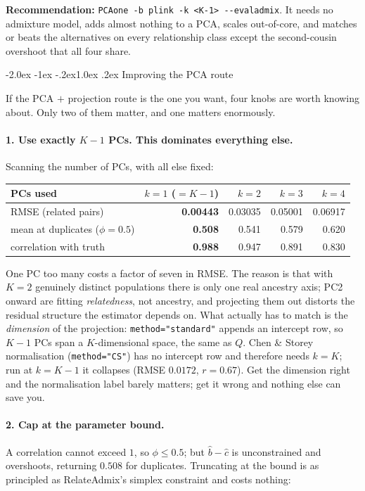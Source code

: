\documentclass[10pt,a4paper]{article}
\makeatletter
\renewcommand\subsection{\@startsection{subsection}{2}{\z@}%
  {-2.0ex \@plus -1ex \@minus -.2ex}{1.0ex \@plus.2ex}%
  {\normalfont\normalsize\bfseries\color{hdr}}}
\makeatother
\begin{document}
\textbf{Recommendation:} \texttt{PCAone -b plink -k <K-1> -{}-evaladmix}. It needs no admixture model, adds
almost nothing to a PCA, scales out-of-core, and matches or beats the alternatives on every relationship
class except the second-cousin overshoot that all four share.

\subsection{Improving the PCA route}

If the PCA $+$ projection route is the one you want, four knobs are worth knowing about. Only two of them
matter, and one matters enormously.

\paragraph{1. Use exactly $K-1$ PCs. This dominates everything else.}
Scanning the number of PCs, with all else fixed:

\begin{center}
\small
\begin{tabular}{@{}lrrrr@{}}
\toprule
PCs used & $k=1$ ($=K{-}1$) & $k=2$ & $k=3$ & $k=4$ \\
\midrule
RMSE (related pairs) & \textbf{0.00443} & 0.03035 & 0.05001 & 0.06917 \\
mean at duplicates ($\phi=0.5$) & \textbf{0.508} & 0.541 & 0.579 & 0.620 \\
correlation with truth & \textbf{0.988} & 0.947 & 0.891 & 0.830 \\
\bottomrule
\end{tabular}
\end{center}

\noindent
One PC too many costs a factor of seven in RMSE. The reason is that with $K=2$ genuinely distinct
populations there is only one real ancestry axis; PC2 onward are fitting \emph{relatedness}, not ancestry, and
projecting them out distorts the residual structure the estimator depends on. What actually has to match is
the \emph{dimension} of the projection: \texttt{method="standard"} appends an intercept row, so $K-1$ PCs
span a $K$-dimensional space, the same as $Q$. Chen \& Storey normalisation (\texttt{method="CS"}) has no
intercept row and therefore needs $k=K$; run at $k=K-1$ it collapses (RMSE $0.0172$, $r=0.67$). Get the
dimension right and the normalisation label barely matters; get it wrong and nothing else can save you.

\paragraph{2. Cap at the parameter bound.} A correlation cannot exceed $1$, so $\phi\le 0.5$; but
$\hat b-\hat c$ is unconstrained and overshoots, returning $0.508$ for duplicates. Truncating at the bound is
as principled as RelateAdmix's simplex constraint and costs nothing:
\end{document}
